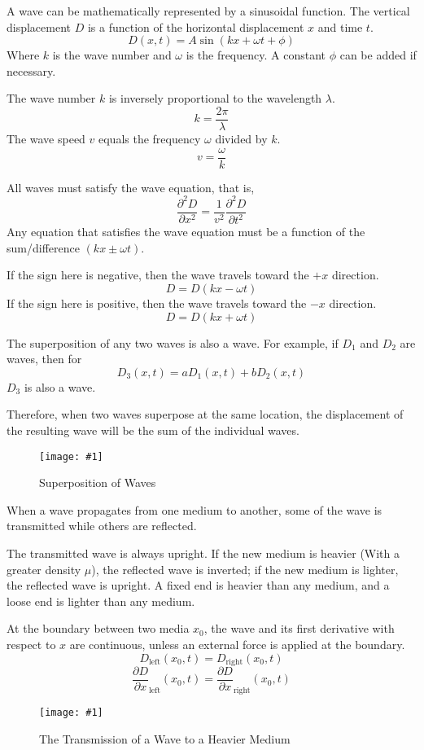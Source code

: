 \documentclass[11pt]{article}
\newcommand{\fig}[4]{
    \begin{figure}[H]
        \centering
        \texttt{[image: \#1]}
        \caption{#2}
        \label{exp4fit}
    \end{figure}
}
\theoremstyle{gangnamstyle}{\newtheorem{definition}{Definition}[]}
\theoremstyle{gangnamstyle}{\newtheorem{example}{Example}[]}
\theoremstyle{gangnamstyle}{\newtheorem{problem}{Problem}[]}
\begin{document}
A wave can be mathematically represented by a sinusoidal function. The vertical displacement $D$ is a function of the horizontal displacement $x$ and time $t$. 
\[ D(x, t) = A\sin(kx + \omega t + \phi) \]
Where $k$ is the wave number and $\omega$ is the frequency. A constant $\phi$ can be added if necessary. 

The wave number $k$ is inversely proportional to the wavelength $\lambda$. 
\[ k = \frac{2\pi}{\lambda} \]
The wave speed $v$ equals the frequency $\omega$ divided by $k$. 
\[ v = \frac{\omega}{k} \]

\pagebreak

All waves must satisfy the wave equation, that is, 
\[ \frac{\partial^2 D}{\partial x^2} = \frac{1}{v^2}\frac{\partial^2 D}{\partial t^2} \]
Any equation that satisfies the wave equation must be a function of the sum/difference $(kx \pm \omega t)$. 

If the sign here is negative, then the wave travels toward the $+x$ direction. 
\[ D = D(kx - \omega t) \]
If the sign here is positive, then the wave travels toward the $-x$ direction. 
\[ D = D(kx + \omega t) \]


The superposition of any two waves is also a wave. For example, if $D_1$ and $D_2$ are waves, then for
\[ D_3(x, t) = aD_1(x, t) + bD_2(x, t) \]
$D_3$ is also a wave. 

Therefore, when two waves superpose at the same location, the displacement of the resulting wave will be the sum of the individual waves. 

\fig{figs/0730/superpose.png}{Superposition of Waves}{0.65}{0}

\pagebreak

When a wave propagates from one medium to another, some of the wave is transmitted while others are reflected. 

The transmitted wave is always upright. If the new medium is heavier (With a greater density $\mu$), the reflected wave is inverted; if the new medium is lighter, the reflected wave is upright. A fixed end is heavier than any medium, and a loose end is lighter than any medium. 

At the boundary between two media $x_0$, the wave and its first derivative with respect to $x$ are continuous, unless an external force is applied at the boundary. 
\[ D_{\text{left}}(x_0, t) = D_{\text{right}}(x_0, t) \]
\[ \frac{\partial D}{\partial x}_{\text{left}}(x_0, t) = \frac{\partial D}{\partial x}_{\text{right}}(x_0, t) \]

\fig{figs/0730/transmit.png}{The Transmission of a Wave to a Heavier Medium}{0.6}{0}
\end{document}
